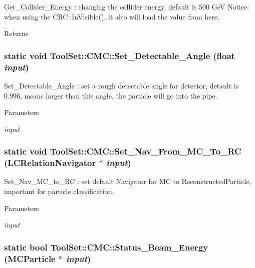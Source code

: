 Get\_\-Collider\_\-Energy : changing the collider energy, default is 500 GeV Notice: when using the CRC::InVisible(), it also will load the value from here. \begin{DoxyReturn}{Returns}

\end{DoxyReturn}
\hypertarget{classToolSet_1_1CMC_a9a095ed39d8742369489455db3b1b641}{
\subsubsection[{Set\_\-Detectable\_\-Angle}]{\setlength{\rightskip}{0pt plus 5cm}static void ToolSet::CMC::Set\_\-Detectable\_\-Angle (float {\em input})}}
\label{classToolSet_1_1CMC_a9a095ed39d8742369489455db3b1b641}


Set\_\-Detectable\_\-Angle : set a rough detectable angle for detector, detault is 0.996, means larger than this angle, the particle will go into the pipe. 
\begin{DoxyParams}{Parameters}
\item[{\em input}]\end{DoxyParams}
\hypertarget{classToolSet_1_1CMC_ab933f8f5cbebde554dcce60f086bf480}{
\subsubsection[{Set\_\-Nav\_\-From\_\-MC\_\-To\_\-RC}]{\setlength{\rightskip}{0pt plus 5cm}static void ToolSet::CMC::Set\_\-Nav\_\-From\_\-MC\_\-To\_\-RC (LCRelationNavigator $\ast$ {\em input})}}
\label{classToolSet_1_1CMC_ab933f8f5cbebde554dcce60f086bf480}


Set\_\-Nav\_\-MC\_\-to\_\-RC : set default Navigator for MC to ReconstructedParticle, important for particle classification. 
\begin{DoxyParams}{Parameters}
\item[{\em input}]\end{DoxyParams}
\hypertarget{classToolSet_1_1CMC_a3ebc24c0c160ba37054b294059f09d96}{
\subsubsection[{Status\_\-Beam\_\-Energy}]{\setlength{\rightskip}{0pt plus 5cm}static bool ToolSet::CMC::Status\_\-Beam\_\-Energy (MCParticle $\ast$ {\em input})}}
\label{classToolSet_1_1CMC_a3ebc24c0c160ba37054b294059f09d96}


